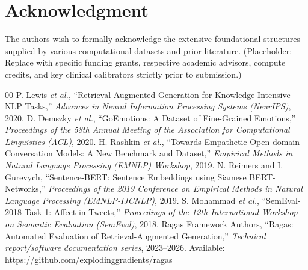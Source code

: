 \documentclass[conference]{IEEEtran}
\begin{document}
\section*{Acknowledgment}

The authors wish to formally acknowledge the extensive foundational structures supplied by various computational datasets and prior literature. (Placeholder: Replace with specific funding grants, respective academic advisors, compute credits, and key clinical calibrators strictly prior to submission.)

\begin{thebibliography}{00}
 P. Lewis \textit{et al.}, ``Retrieval-Augmented Generation for Knowledge-Intensive NLP Tasks,'' \textit{Advances in Neural Information Processing Systems (NeurIPS)}, 2020.
 D. Demszky \textit{et al.}, ``GoEmotions: A Dataset of Fine-Grained Emotions,'' \textit{Proceedings of the 58th Annual Meeting of the Association for Computational Linguistics (ACL)}, 2020.
 H. Rashkin \textit{et al.}, ``Towards Empathetic Open-domain Conversation Models: A New Benchmark and Dataset,'' \textit{Empirical Methods in Natural Language Processing (EMNLP) Workshop}, 2019.
 N. Reimers and I. Gurevych, ``Sentence-BERT: Sentence Embeddings using Siamese BERT-Networks,'' \textit{Proceedings of the 2019 Conference on Empirical Methods in Natural Language Processing (EMNLP-IJCNLP)}, 2019.
 S. Mohammad \textit{et al.}, ``SemEval-2018 Task 1: Affect in Tweets,'' \textit{Proceedings of the 12th International Workshop on Semantic Evaluation (SemEval)}, 2018.
 Ragas Framework Authors, ``Ragas: Automated Evaluation of Retrieval-Augmented Generation,'' \textit{Technical report/software documentation series}, 2023--2026. Available: https://github.com/explodinggradients/ragas
\end{thebibliography}
\end{document}
